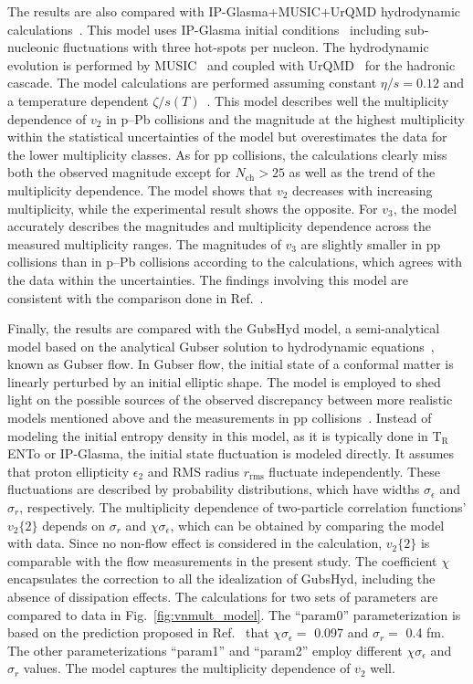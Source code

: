 The results are also compared with IP-Glasma+MUSIC+UrQMD hydrodynamic calculations~\cite{Schenke:2020mbo}. This model uses IP-Glasma initial conditions~\cite{Schenke:2012wb} including sub-nucleonic fluctuations with three hot-spots per nucleon. The hydrodynamic evolution is performed by MUSIC~\cite{Schenke:2010rr} and coupled with UrQMD~\cite{Bass:1998ca,Bleicher:1999xi} for the hadronic cascade. 
The model calculations are performed assuming constant $\eta/s=0.12$ and a temperature dependent $\zeta/s(T)$~\cite{Rose:2020lfc}. 
This model describes well the multiplicity dependence of $v_2$ in p--Pb collisions and the magnitude at the highest multiplicity within the statistical uncertainties of the model but overestimates the data for the lower multiplicity classes. As for pp collisions, the calculations clearly miss both the observed magnitude except for $N_\mathrm{ch}>25$ as well as the trend of the multiplicity dependence. The model shows that $v_2$ decreases with increasing multiplicity, while the experimental result shows the opposite.
For $v_3$, the model accurately describes the magnitudes and multiplicity dependence across the measured multiplicity ranges. The magnitudes of $v_3$ are slightly smaller in pp collisions than in p--Pb collisions according to the calculations, which agrees with the data within the uncertainties. The findings involving this model are consistent with the comparison done in Ref.~\cite{Acharya:2019vdf}.

Finally, the results are compared with the GubsHyd model, a semi-analytical model based on the analytical Gubser solution to hydrodynamic equations~\cite{Gubser:2010ze,Gubser:2010ui}, known as Gubser flow. In Gubser flow, the initial state of a conformal matter is linearly perturbed by an initial elliptic shape. The model is employed to shed light on the possible sources of the observed discrepancy between more realistic models mentioned above and the measurements in pp collisions~\cite{Taghavi:2019mqz}. Instead of modeling the initial entropy density in this model, as it is typically done in T$_{\text{R}}$ENTo or IP-Glasma, the initial state fluctuation is modeled directly. It assumes that proton ellipticity $\epsilon_{2}$ and RMS radius $r_{\text{rms}}$ fluctuate independently. These fluctuations are described by probability distributions, which have widths $\sigma_{\epsilon}$
 and $\sigma_{r}$, respectively. The multiplicity dependence of two-particle correlation functions' $v_2\{2\}$ depends on $\sigma_{r}$ and  $\chi\sigma_{\epsilon}$, which can be obtained by comparing the model with data. Since no non-flow effect is considered in the calculation, $v_2\{2\}$ is comparable with the flow measurements in the present study. The coefficient $\chi$ encapsulates the correction to all the idealization of GubsHyd, including the absence of dissipation effects. The calculations for two sets of parameters are compared
to data in Fig.~\ref{fig:vnmult_model}. The “param0” parameterization is based on the prediction proposed in Ref.~\cite{Taghavi:2019mqz} that $\chi \sigma_{\epsilon} =$ 0.097 and $\sigma_{r} =$ 0.4 fm. The other parameterizations “param1” and “param2” employ different $\chi \sigma_{\epsilon}$  and $\sigma_{r}$ values. The model captures the multiplicity dependence of $v_2$ well.

